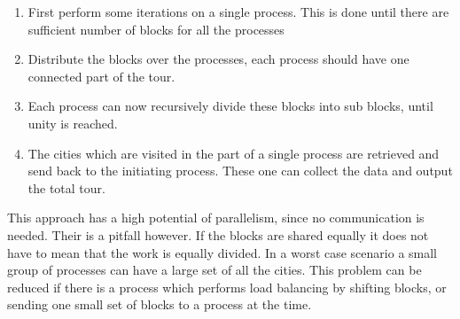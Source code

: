 \begin{enumerate}
\item First perform some iterations on a single process. This is done until
there are sufficient number of blocks for all the processes
\item Distribute the blocks over the processes, each process should have one
connected part of the tour.
\item Each process can now recursively divide these blocks into sub blocks,
until unity is reached.
\item The cities which are visited in the part of a single process are
retrieved and send back to the initiating process. These one can collect the
data and output the total tour.
\end{enumerate}

This approach has a high potential of parallelism, since no communication is
needed. Their is a pitfall however. If the blocks are shared equally it does
not have to mean that the work is equally divided. In a worst case scenario a
small group of processes can have a large set of all the cities. This problem
can be reduced if there is a process which performs load balancing by shifting
blocks, or sending one small set of blocks to a process at the time.

